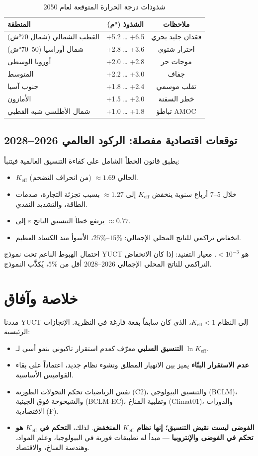 \documentclass[12pt,a4paper]{article}
\newcommand{\Keff}{K_{\mathrm{eff}}}
\begin{document}
	\begin{table}[H]
		\centering
		\caption{شذوذات درجة الحرارة المتوقعة لعام 2050}
		\begin{tabular}{lcc}
			\toprule
			المنطقة & الشذوذ (°م) & ملاحظات \\
			\midrule
			القطب الشمالي (شمال 70°ش) & +5.2 … +6.5 & فقدان جليد بحري \\
			شمال أوراسيا (50–70°ش) & +2.8 … +3.6 & احترار شتوي \\
			أوروبا الوسطى & +2.0 … +2.8 & موجات حر \\
			المتوسط & +2.2 … +3.0 & جفاف \\
			جنوب آسيا & +1.8 … +2.4 & تقلب موسمي \\
			الأمازون & +1.5 … +2.0 & خطر السفنة \\
			شمال الأطلسي شبه القطبي & +1.0 … +1.8 & تباطؤ AMOC \\
			\bottomrule
		\end{tabular}
	\end{table}
	
	\subsection{توقعات اقتصادية مفصلة: الركود العالمي 2026–2028}
	يطبق قانون الخطأ الشامل على كفاءة التنسيق العالمية فيتنبأ:
	\begin{itemize}
		\item \(\Keff\) الحالي \(\approx 1.69\) (من انحراف التضخم).
		\item خلال 5–7 أرباع سنوية ينخفض \(\Keff\) إلى \(\approx 1.27\) بسبب تجزئة التجارة، صدمات الطاقة، والتشديد النقدي.
		\item يرتفع خطأ التنسيق الناتج \(\varepsilon\) إلى \(\approx 0.77\).
		\item انخفاض تراكمي للناتج المحلي الإجمالي: \(15\%\)–\(25\%\)، الأسوأ منذ الكساد العظيم.
	\end{itemize}
	احتمال الهبوط الناعم تحت نموذج YUCT هو \(<10^{-3}\).
	معيار التفنيد: إذا كان الانخفاض التراكمي للناتج المحلي الإجمالي 2026–2028 أقل من \(5\%\)، يُكذَّب النموذج.
	
	\section{خلاصة وآفاق}
	مددنا YUCT إلى النظام \(\Keff < 1\)، الذي كان سابقاً بقعة فارغة في النظرية. الإنجازات الرئيسية:
	
	\begin{itemize}
		\item \textbf{التنسيق السلبي} معرّف كعدم استقرار تاكيوني بنمو أسي لـ \(\ln \Keff\).
		\item \textbf{عدم الاستقرار البنّاء} يميز بين الانهيار المطلق ونشوء نظام جديد، اعتماداً على بقاء القواميس الأساسية.
		\item نفس الرياضيات تحكم التحولات الطورية (C2)، والتنسيق البيولوجي (BCLM)، والشيخوخة فوق الجينية (BCLM‑EC)، وتقلبية المناخ (Climat01)، والدورات الاقتصادية (F).
		\item \textbf{الفوضى ليست نقيض التنسيق؛ إنها نظام \(\Keff\) المنخفض}. لذلك، \textbf{التحكم في \(\Keff\) هو تحكم في الفوضى والإنتروبيا} — مبدأ له تطبيقات فورية في البيولوجيا، وعلم المواد، وهندسة المناخ، والاقتصاد.
	\end{itemize}
	
\end{document}
